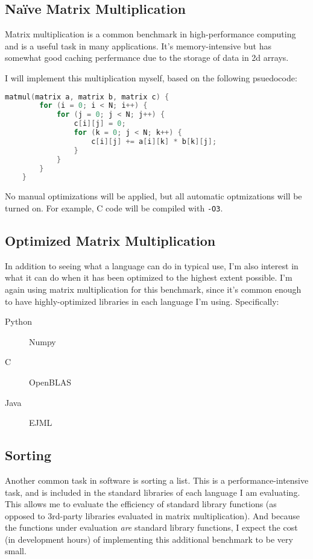 \documentclass[12pt,letterpaper]{article}
\begin{document}
\subsection{Naïve Matrix Multiplication}

Matrix multiplication is a common benchmark in high-performance computing and is
a useful task in many applications. It's memory-intensive but has somewhat good
caching perfermance due to the storage of data in 2d arrays.

I will implement this multiplication myself, based on the following psuedocode:

\begin{lstlisting}[language=c]
	matmul(matrix a, matrix b, matrix c) {
		for (i = 0; i < N; i++) {
			for (j = 0; j < N; j++) {
				c[i][j] = 0;
				for (k = 0; j < N; k++) {
					c[i][j] += a[i][k] * b[k][j];
				}
			}
		}
	}
\end{lstlisting}

No manual optimizations will be applied, but all automatic optmizations will be
turned on. For example, C code will be compiled with \texttt{-O3}.

\subsection{Optimized Matrix Multiplication}

In addition to seeing what a language can do in typical use, I'm also interest
in what it can do when it has been optimized to the highest extent possible. I'm
again using matrix multiplication for this benchmark, since it's common enough
to have highly-optimized libraries in each language I'm using. Specifically:

\begin{description}
	\item [Python] Numpy
	\item [C] OpenBLAS
	\item [Java] EJML
\end{description}

\subsection{Sorting}

Another common task in software is sorting a list. This is a
performance-intensive task, and is included in the standard libraries of each
language I am evaluating. This allows me to evaluate the efficiency of standard
library functions (as opposed to 3rd-party libraries evaluated in matrix
multiplication). And because the functions under evaluation \emph{are} standard
library functions, I expect the cost (in development hours) of implementing this
additional benchmark to be very small.
\end{document}
